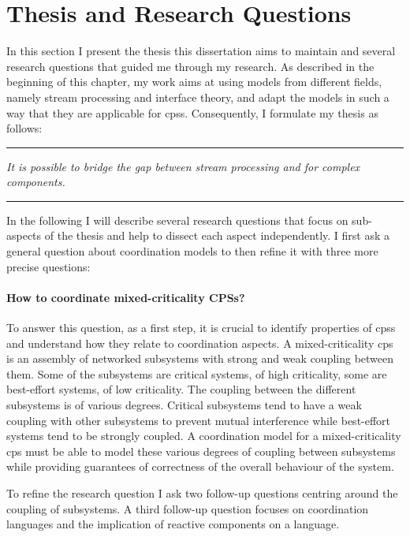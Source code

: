 \section{Thesis and Research Questions}
\label{sect_intro_question}
In this section I present the thesis this dissertation aims to maintain and several research questions that guided me through my research.
As described in the beginning of this chapter, my work aims at using models from different fields, namely stream processing and interface theory, and adapt the models in such a way that they are applicable for \glspl{cps}.
Consequently, I formulate my thesis as follows:
\begin{center}
    \rule[5mm]{\textwidth}{0.4pt}
    \parbox{0.8\textwidth}{
    \centering
        \emph{It is possible to bridge the gap between stream processing and  for complex components.}
    }
    \rule[-2mm]{\textwidth}{0.4pt}
\end{center}

In the following I will describe several research questions that focus on sub-aspects of the thesis and help to dissect each aspect independently.
I first ask a general question about coordination models to then refine it with three more precise questions:

\paragraph*{How to coordinate mixed-criticality CPSs?} \hfill

To answer this question, as a first step, it is crucial to identify properties of \glspl{cps} and understand how they relate to coordination aspects.
A mixed-criticality \gls{cps} is an assembly of networked subsystems with strong and weak coupling between them.
Some of the subsystems are critical systems, \ie of high criticality, some are best-effort systems, \ie of low criticality.
The coupling between the different subsystems is of various degrees.
Critical subsystems tend to have a weak coupling with other subsystems to prevent mutual interference while best-effort systems tend to be strongly coupled.
A coordination model for a mixed-criticality \gls{cps} must be able to model these various degrees of coupling between subsystems while providing guarantees of correctness of the overall behaviour of the system.

To refine the research question I ask two follow-up questions centring around the coupling of subsystems.
A third follow-up question focuses on coordination languages and the implication of reactive components on a language.

